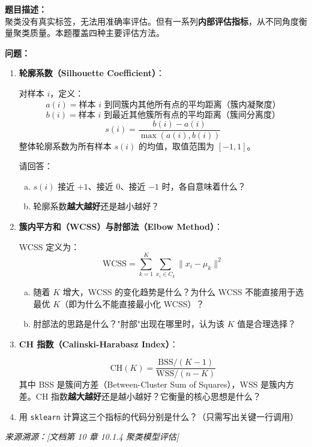 \documentclass[a4paper,11pt]{ctexart}
\begin{document}
\begin{problembox}
    \textbf{题目描述：}\\
    聚类没有真实标签，无法用准确率评估。但有一系列\textbf{内部评估指标}，从不同角度衡量聚类质量。本题覆盖四种主要评估方法。

    \vspace{0.2cm}
    \textbf{问题：}
    \begin{enumerate}[(1)]
        \item \textbf{轮廓系数（Silhouette Coefficient）}：

        对样本 $i$，定义：
        \[
        a(i) = \text{样本 } i \text{ 到同簇内其他所有点的平均距离（簇内凝聚度）}
        \]
        \[
        b(i) = \text{样本 } i \text{ 到最近其他簇所有点的平均距离（簇间分离度）}
        \]
        \[
        s(i) = \frac{b(i) - a(i)}{\max(a(i), b(i))}
        \]
        整体轮廓系数为所有样本 $s(i)$ 的均值，取值范围为 $[-1, 1]$。

        请回答：
        \begin{enumerate}[a.]
            \item $s(i)$ 接近 $+1$、接近 $0$、接近 $-1$ 时，各自意味着什么？
            \item 轮廓系数\textbf{越大越好}还是越小越好？
        \end{enumerate}

        \item \textbf{簇内平方和（WCSS）与肘部法（Elbow Method）}：

        WCSS 定义为：
        \[
        \text{WCSS} = \sum_{k=1}^{K} \sum_{x_i \in C_k} \|x_i - \mu_k\|^2
        \]

        \begin{enumerate}[a.]
            \item 随着 $K$ 增大，WCSS 的变化趋势是什么？为什么 WCSS 不能直接用于选最优 $K$（即为什么不能直接最小化 WCSS）？
            \item 肘部法的思路是什么？"肘部"出现在哪里时，认为该 $K$ 值是合理选择？
        \end{enumerate}

        \item \textbf{CH 指数（Calinski-Harabasz Index）}：

        \[
        \text{CH}(K) = \frac{\text{BSS}/(K-1)}{\text{WSS}/(n-K)}
        \]
        其中 BSS 是簇间方差（Between-Cluster Sum of Squares），WSS 是簇内方差。CH 指数\textbf{越大越好}还是越小越好？它衡量的核心思想是什么？

        \item 用 \texttt{sklearn} 计算这三个指标的代码分别是什么？（只需写出关键一行调用）
    \end{enumerate}

    \vspace{0.2cm}
    {\color{gray}\small\textit{来源溯源：[文档第 10 章 10.1.4 聚类模型评估]}}
\end{problembox}
\end{document}
